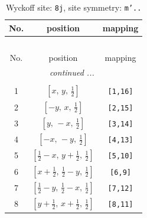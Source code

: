 \documentclass[fleqn,8pt]{jsarticle}
\begin{document}
\begin{longtable}{ccc}
\caption{Wyckoff site: {\tt 8j}, site symmetry: {\tt m'..}}
 \\
 \hline \hline
No. & position & mapping \\ \hline \endfirsthead

\multicolumn{2}{l}{\tablename\ \thetable{}} \\
 \hline \hline
No. & position & mapping \\ \hline \endhead

 \hline \hline
\multicolumn{2}{r}{\footnotesize\it continued ...} \\ \endfoot

 \hline \hline
\multicolumn{2}{r}{} \\ \endlastfoot

1 & $\left[ x,\, y,\, \frac{1}{2} \right]$ & {\tt [1,16]} \\ \hline
2 & $\left[ - y,\, x,\, \frac{1}{2} \right]$ & {\tt [2,15]} \\ \hline
3 & $\left[ y,\, - x,\, \frac{1}{2} \right]$ & {\tt [3,14]} \\ \hline
4 & $\left[ - x,\, - y,\, \frac{1}{2} \right]$ & {\tt [4,13]} \\ \hline
5 & $\left[ \frac{1}{2} - x,\, y + \frac{1}{2},\, \frac{1}{2} \right]$ & {\tt [5,10]} \\ \hline
6 & $\left[ x + \frac{1}{2},\, \frac{1}{2} - y,\, \frac{1}{2} \right]$ & {\tt [6,9]} \\ \hline
7 & $\left[ \frac{1}{2} - y,\, \frac{1}{2} - x,\, \frac{1}{2} \right]$ & {\tt [7,12]} \\ \hline
8 & $\left[ y + \frac{1}{2},\, x + \frac{1}{2},\, \frac{1}{2} \right]$ & {\tt [8,11]} \\
\end{longtable}
\renewcommand{\arraystretch}{1.2}
\end{document}
